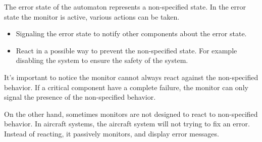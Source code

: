The error state of the automaton represents a non-specified state. In the error state the monitor is active, various actions can be taken.
\begin{itemize}
	\item Signaling the error state to notify other components about the error state.
	\item React in a possible way to prevent the non-specified state. For example disabling the system to ensure the safety of the system.
\end{itemize}

It's important to notice the monitor cannot always react against the non-specified behavior. If a critical component have a complete failure, the monitor can only signal the presence of the non-specified behavior.

On the other hand, sometimes monitors are not designed to react to non-specified behavior. In aircraft systems, the aircraft system will not trying to fix an error. Instead of reacting, it passively monitors, and display error messages.
